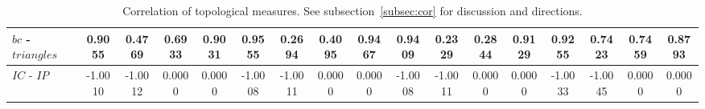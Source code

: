 \documentclass[%
 aip,
 jmp,%
 amsmath,amssymb,
 reprint,%
 floatfix,
]{revtex4-1}
\begin{document}
\begin{table}
\begin{tabular}{|l|| c|c|c|c||  c|c|c|c||   c|c|c|c||   c|c|c|c|}
$bc$ - $triangles$ & 0.9055 & 0.4769 & 0.6933 & 0.9031 & 0.9555 & 0.2694 & 0.4095 & 0.9467 & 0.9409 & 0.2329 & 0.2844 & 0.9129 & 0.9255 & 0.7423 & 0.7459 & 0.8793 \\ \hline
$IC$ - $IP$ & -1.0010 & -1.0012 & 0.0000 & 0.0000 & -1.0008 & -1.0011 & 0.0000 & 0.0000 & -1.0008 & -1.0011 & 0.0000 & 0.0000 & -1.0033 & -1.0045 & 0.0000 & 0.0000 \\ \hline
  \end{tabular}
  \caption{Correlation of topological measures. See subsection~\ref{subsec:cor} for discussion and directions.}
  \label{tab:corTop}
\end{table}

\clearpage
\end{document}

